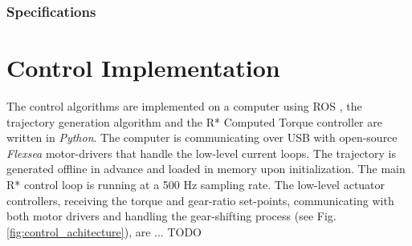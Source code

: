 \subsubsection{Specifications}









\section{Control Implementation}
\label{sec:ControlSoftwareArchitecture}

The control algorithms are implemented on a computer using ROS \cite{quigley_ros:_2009}, the trajectory generation algorithm and the R* Computed Torque controller are written in \textit{Python}. The computer is communicating over USB with open-source \textit{Flexsea} motor-drivers \cite{duval_flexsea-execute:_2016} that handle the low-level current loops. The trajectory is generated offline in advance and loaded in memory upon initialization. The main R* control loop is running at a 500 Hz sampling rate. The low-level actuator controllers, receiving the torque and gear-ratio set-points, communicating with both motor drivers and handling the gear-shifting process (see Fig. \ref{fig:control_achitecture}), are ... TODO

